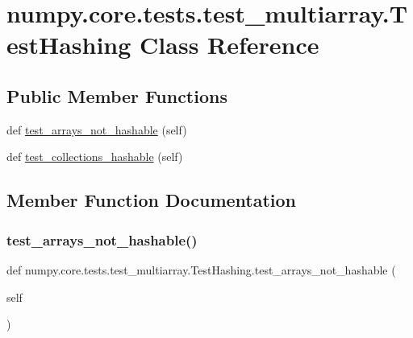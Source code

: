 \hypertarget{classnumpy_1_1core_1_1tests_1_1test__multiarray_1_1TestHashing}{}\section{numpy.\+core.\+tests.\+test\+\_\+multiarray.\+Test\+Hashing Class Reference}
\label{classnumpy_1_1core_1_1tests_1_1test__multiarray_1_1TestHashing}
\subsection*{Public Member Functions}
\begin{DoxyCompactItemize}
\item 
def \hyperlink{classnumpy_1_1core_1_1tests_1_1test__multiarray_1_1TestHashing_a17b4bf9dca01516fdc398b11ba1a72e2}{test\+\_\+arrays\+\_\+not\+\_\+hashable} (self)
\item 
def \hyperlink{classnumpy_1_1core_1_1tests_1_1test__multiarray_1_1TestHashing_a3a6c94e5455e57ee7952b289c2f0f323}{test\+\_\+collections\+\_\+hashable} (self)
\end{DoxyCompactItemize}


\subsection{Member Function Documentation}
\mbox{\label{classnumpy_1_1core_1_1tests_1_1test__multiarray_1_1TestHashing_a17b4bf9dca01516fdc398b11ba1a72e2}} 
\subsubsection{\texorpdfstring{test\+\_\+arrays\+\_\+not\+\_\+hashable()}{test\_arrays\_not\_hashable()}}
{\footnotesize\ttfamily def numpy.\+core.\+tests.\+test\+\_\+multiarray.\+Test\+Hashing.\+test\+\_\+arrays\+\_\+not\+\_\+hashable (\begin{DoxyParamCaption}\item[{}]{self }\end{DoxyParamCaption})}

